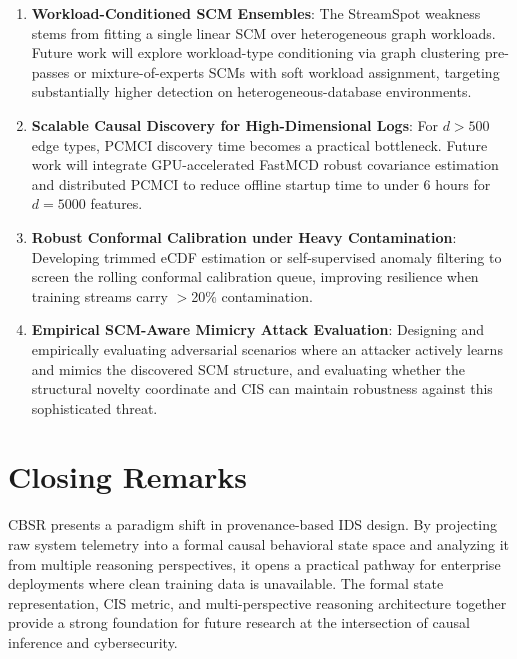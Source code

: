 \begin{enumerate}
\item \textbf{Workload-Conditioned SCM Ensembles}: The StreamSpot weakness stems from fitting a
    single linear SCM over heterogeneous graph workloads. Future work will explore workload-type
    conditioning via graph clustering pre-passes or mixture-of-experts SCMs with soft workload
    assignment, targeting substantially higher detection on heterogeneous-database environments.

\item \textbf{Scalable Causal Discovery for High-Dimensional Logs}: For $d > 500$ edge types,
    PCMCI discovery time becomes a practical bottleneck. Future work will integrate
    GPU-accelerated FastMCD robust covariance estimation and distributed PCMCI to reduce offline
    startup time to under 6 hours for $d = 5000$ features.

\item \textbf{Robust Conformal Calibration under Heavy Contamination}: Developing trimmed eCDF
    estimation or self-supervised anomaly filtering to screen the rolling conformal calibration
    queue, improving resilience when training streams carry $>$20\% contamination.

\item \textbf{Empirical SCM-Aware Mimicry Attack Evaluation}: Designing and empirically
    evaluating adversarial scenarios where an attacker actively learns and mimics the discovered
    SCM structure, and evaluating whether the structural novelty coordinate and CIS can maintain
    robustness against this sophisticated threat.
\end{enumerate}


\section{Closing Remarks}

CBSR presents a paradigm shift in provenance-based IDS design. By projecting raw system telemetry
into a formal causal behavioral state space and analyzing it from multiple reasoning perspectives,
it opens a practical pathway for enterprise deployments where clean training data is unavailable.
The formal state representation, CIS metric, and multi-perspective reasoning architecture together
provide a strong foundation for future research at the intersection of causal inference and
cybersecurity.
